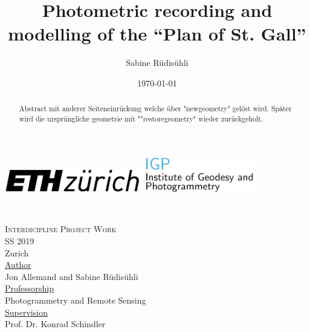 \documentclass[a4paper,twoside,11pt,openright,table,draft]{article} %
\title{Photometric recording and modelling of the “Plan of St. Gall”}
\author{Sabine Rüdisühli}
\date{\today}
\begin{document}


\makeatletter
    \begin{titlepage}
    \includegraphics[height = 10mm]{fig/ETH.png}%
    \hfill
    \quad
    \includegraphics[height = 15mm]{fig/LogoIGP.png} \\[15ex]
        \begin{center}
            {\huge \bfseries  \@title }\\[9ex] 
            \begin{Large}
             {\textsc{Interdicipline Project Work }}\\[1ex]
              SS 2019 \\
			Zurich\\[5ex]       
                    \makeatother
                    \underline{Author} \\
                    Jon Allemand and Sabine Rüdisühli \\[2ex]
  					\makeatletter
  					\underline{Professorship} \\
  					Photogrammetry and Remote Sensing \\[2ex]
  					\underline{Supervision}\\
  					 Prof. Dr. Konrad Schindler \\[5ex]				
            \end{Large}
 		\end{center}     
    \end{titlepage}
\makeatother
\pagestyle{empty}
\cleardoublepage



\begin{abstract}
\noindent Abstract mit anderer Seiteneinrückung welche über "newgeometry" gelöst wird. Später wird die ursprüngliche geometrie mit ""restoregeometry" wieder zurückgeholt. \\
\end{abstract}
\end{document}
